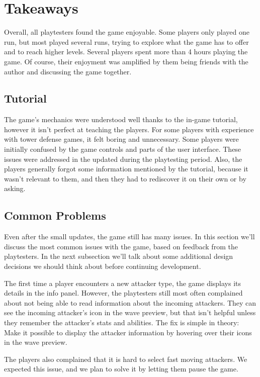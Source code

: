 \section{Takeaways}

Overall, all playtesters found the game enjoyable.
Some players only played one run, but most played several runs, trying to explore what the game has to offer and to reach higher levels.
Several players spent more than 4 hours playing the game.
Of course, their enjoyment was amplified by them being friends with the author and discussing the game together.

\subsection{Tutorial}
The game's mechanics were understood well thanks to the in-game tutorial, however it isn't perfect at teaching the players.
For some players with experience with tower defense games, it felt boring and unnecessary.
Some players were initially confused by the game controls and parts of the user interface.
These issues were addressed in the updated during the playtesting period.
Also, the players generally forgot some information mentioned by the tutorial, because it wasn't relevant to them, and then they had to rediscover it on their own or by asking.

\subsection{Common Problems}
Even after the small updates, the game still has many issues.
In this section we'll discuss the most common issues with the game, based on feedback from the playtesters.
In the next subsection we'll talk about some additional design decisions we should think about before continuing development.

The first time a player encounters a new attacker type, the game displays its details in the info panel.
However, the playtesters still most often complained about not being able to read information about the incoming attackers.
They can see the incoming attacker's icon in the wave preview, but that isn't helpful unless they remember the attacker's stats and abilities.
The fix is simple in theory:
Make it possible to display the attacker information by hovering over their icons in the wave preview.

The players also complained that it is hard to select fast moving attackers.
We expected this issue, and we plan to solve it by letting them pause the game.

